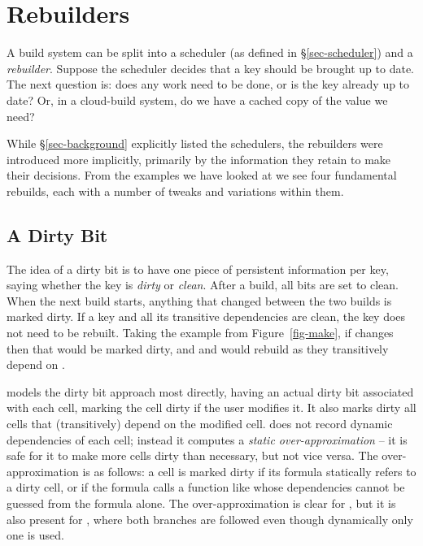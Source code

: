 \section{Rebuilders}\label{sec-rebuilder}

A build system can be split into a scheduler (as defined in \S\ref{sec-scheduler}) and a \emph{rebuilder}. Suppose the scheduler decides that a key should be brought up to date. The next
question is: does any work need to be done, or is the key already up to date?
Or, in a cloud-build system, do we have a cached copy of the value we need?

While \S\ref{sec-background} explicitly listed the schedulers, the rebuilders were introduced more implicitly, primarily by the information they retain to make their decisions. From the examples we have looked at we see four fundamental rebuilds, each with a number of tweaks and variations within them.

\subsection{A Dirty Bit}\label{sec-dirty-bit}

The idea of a dirty bit is to have one piece of persistent information per key,
saying whether the key is \emph{dirty} or \emph{clean}. After a build, all bits
are set to clean. When the next build starts, anything that changed between the
two builds is marked dirty. If a key and all its transitive dependencies are
clean, the key does not need to be rebuilt. Taking the example from
Figure~\ref{fig-make}, if  changes then that would be marked dirty, and  and  would rebuild as they transitively depend on .

\Excel models the dirty bit approach most directly, having an actual dirty bit
associated with each cell, marking the cell dirty if the user modifies it.
It also marks dirty all cells that (transitively) depend on the modified cell.
\Excel does not record dynamic dependencies of each cell; instead it computes a
\emph{static over-approximation} -- it is safe for it to make more cells dirty
than necessary, but not vice versa. The over-approximation is as follows: a cell
is marked dirty if its formula statically refers to a dirty cell, or if the
formula calls a function like  whose dependencies cannot be
guessed from the formula alone. The over-approximation is clear for
, but it is also present for , where both branches are
followed even though dynamically only one is used.

